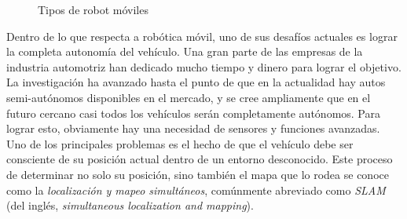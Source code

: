 \begin{figure}%
    \centering
    \qquad
    \qquad
    \qquad
    \qquad
    \caption{Tipos de robot móviles}
    \label{fig:mobilerobots}
\end{figure}

Dentro de lo que respecta a robótica móvil, uno de sus desafíos actuales es lograr la completa autonomía del vehículo. Una gran parte de las empresas de la industria automotriz han dedicado mucho tiempo y dinero para lograr el objetivo. La investigación ha avanzado hasta el punto de que en la actualidad hay autos semi-autónomos disponibles en el mercado, y se cree ampliamente que en el futuro cercano casi todos los vehículos serán completamente autónomos. Para lograr esto, obviamente hay una necesidad de sensores y funciones avanzadas. Uno de los principales problemas es el hecho de que el vehículo debe ser consciente de su posición actual dentro de un entorno desconocido. Este proceso de determinar no solo su posición, sino también el mapa que lo rodea se conoce como la \textit{localización y mapeo simultáneos}, comúnmente abreviado como \textit{SLAM} (del inglés, \textit{simultaneous localization and mapping}).

